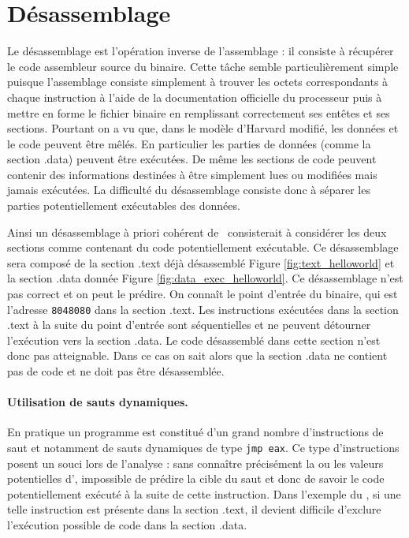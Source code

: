 \section{Désassemblage}
Le désassemblage est l'opération inverse de l'assemblage : il consiste à récupérer le code assembleur source du binaire.
Cette tâche semble particulièrement simple puisque l'assemblage consiste simplement à trouver les octets correspondants à chaque instruction à l'aide de la documentation officielle du processeur puis à mettre en forme le fichier binaire en remplissant correctement ses entêtes et ses sections.
Pourtant on a vu que, dans le modèle d'Harvard modifié, les données et le code peuvent être mêlés. 
En particulier les parties de données (comme la section .data) peuvent être exécutées. 
De même les sections de code peuvent contenir des informations destinées à être simplement lues ou modifiées mais jamais exécutées.
La difficulté du désassemblage consiste donc à séparer les parties potentiellement exécutables des données.

Ainsi un désassemblage à priori cohérent de \helloworld\ consisterait à considérer les deux sections comme contenant du code potentiellement exécutable. Ce désassemblage sera composé de la section .text déjà désassemblé Figure \ref{fig:text_helloworld} et la section .data donnée Figure \ref{fig:data_exec_helloworld}.
Ce désassemblage n'est pas correct et on peut le prédire. 
On connaît le point d'entrée du binaire, qui est l'adresse \texttt{8048080} dans la section .text.
Les instructions exécutées dans la section .text à la suite du point d'entrée sont séquentielles et ne peuvent détourner l'exécution vers la section .data. 
Le code désassemblé dans cette section n'est donc pas atteignable. Dans ce cas on sait alors que la section .data ne contient pas de code et ne doit pas être désassemblée.

\paragraph{Utilisation de sauts dynamiques.}
En pratique un programme est constitué d'un grand nombre d'instructions de saut et notamment de sauts dynamiques de type \texttt{jmp eax}.
Ce type d'instructions posent un souci lors de l'analyse : sans connaître précisément la ou les valeurs potentielles d'\eax, impossible de prédire la cible du saut et donc de savoir le code potentiellement exécuté à la suite de cette instruction.
Dans l'exemple du \helloworld, si une telle instruction est présente dans la section .text, il devient difficile d'exclure l'exécution possible de code dans la section .data.

